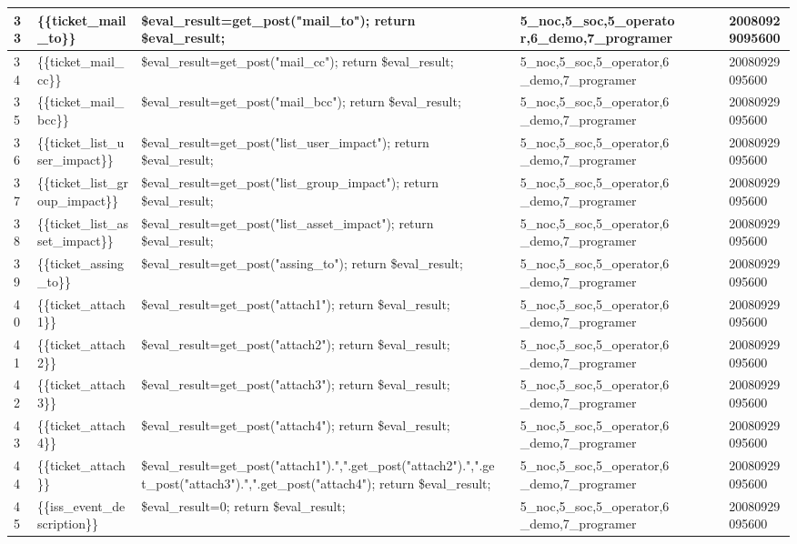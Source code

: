 \begin{longtable}{|l|l|l|l|l|l|l|l|l|}
33 & \{\{ticket\_mail\_to\}\} & \$eval\_result=get\_post("mail\_to");
return \$eval\_result; &  & 5\_noc,5\_soc,5\_operator,6\_demo,7\_programer &  &  &  & 20080929095600 \\ \hline 
34 & \{\{ticket\_mail\_cc\}\} & \$eval\_result=get\_post("mail\_cc");
return \$eval\_result; &  & 5\_noc,5\_soc,5\_operator,6\_demo,7\_programer &  &  &  & 20080929095600 \\ \hline 
35 & \{\{ticket\_mail\_bcc\}\} & \$eval\_result=get\_post("mail\_bcc");
return \$eval\_result; &  & 5\_noc,5\_soc,5\_operator,6\_demo,7\_programer &  &  &  & 20080929095600 \\ \hline 
36 & \{\{ticket\_list\_user\_impact\}\} & \$eval\_result=get\_post("list\_user\_impact");
return \$eval\_result; &  & 5\_noc,5\_soc,5\_operator,6\_demo,7\_programer &  &  &  & 20080929095600 \\ \hline 
37 & \{\{ticket\_list\_group\_impact\}\} & \$eval\_result=get\_post("list\_group\_impact");
return \$eval\_result; &  & 5\_noc,5\_soc,5\_operator,6\_demo,7\_programer &  &  &  & 20080929095600 \\ \hline 
38 & \{\{ticket\_list\_asset\_impact\}\} & \$eval\_result=get\_post("list\_asset\_impact");
return \$eval\_result; &  & 5\_noc,5\_soc,5\_operator,6\_demo,7\_programer &  &  &  & 20080929095600 \\ \hline 
39 & \{\{ticket\_assing\_to\}\} & \$eval\_result=get\_post("assing\_to");
return \$eval\_result; &  & 5\_noc,5\_soc,5\_operator,6\_demo,7\_programer &  &  &  & 20080929095600 \\ \hline 
40 & \{\{ticket\_attach1\}\} & \$eval\_result=get\_post("attach1");
return \$eval\_result; &  & 5\_noc,5\_soc,5\_operator,6\_demo,7\_programer &  &  &  & 20080929095600 \\ \hline 
41 & \{\{ticket\_attach2\}\} & \$eval\_result=get\_post("attach2");
return \$eval\_result; &  & 5\_noc,5\_soc,5\_operator,6\_demo,7\_programer &  &  &  & 20080929095600 \\ \hline 
42 & \{\{ticket\_attach3\}\} & \$eval\_result=get\_post("attach3");
return \$eval\_result; &  & 5\_noc,5\_soc,5\_operator,6\_demo,7\_programer &  &  &  & 20080929095600 \\ \hline 
43 & \{\{ticket\_attach4\}\} & \$eval\_result=get\_post("attach4");
return \$eval\_result; &  & 5\_noc,5\_soc,5\_operator,6\_demo,7\_programer &  &  &  & 20080929095600 \\ \hline 
44 & \{\{ticket\_attach\}\} & \$eval\_result=get\_post("attach1").",".get\_post("attach2").",".get\_post("attach3").",".get\_post("attach4");
return \$eval\_result; &  & 5\_noc,5\_soc,5\_operator,6\_demo,7\_programer &  &  &  & 20080929095600 \\ \hline 
45 & \{\{iss\_event\_description\}\} & \$eval\_result=0;
return \$eval\_result; &  & 5\_noc,5\_soc,5\_operator,6\_demo,7\_programer &  &  &  & 20080929095600 \\ \hline 
 \end{longtable}

